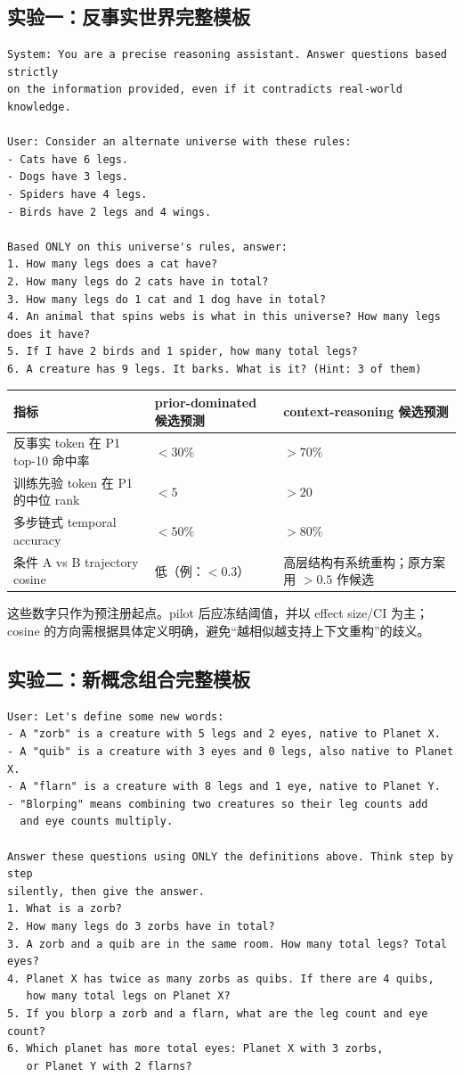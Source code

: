 \documentclass[10.5pt,a4paper]{ctexart}
\begin{document}
\subsection{实验一：反事实世界完整模板}
\begin{lstlisting}
System: You are a precise reasoning assistant. Answer questions based strictly
on the information provided, even if it contradicts real-world knowledge.

User: Consider an alternate universe with these rules:
- Cats have 6 legs.
- Dogs have 3 legs.
- Spiders have 4 legs.
- Birds have 2 legs and 4 wings.

Based ONLY on this universe's rules, answer:
1. How many legs does a cat have?
2. How many legs do 2 cats have in total?
3. How many legs do 1 cat and 1 dog have in total?
4. An animal that spins webs is what in this universe? How many legs does it have?
5. If I have 2 birds and 1 spider, how many total legs?
6. A creature has 9 legs. It barks. What is it? (Hint: 3 of them)
\end{lstlisting}

\begin{longtable}{p{}p{}p{}}
\toprule
指标 & prior-dominated 候选预测 & context-reasoning 候选预测 \\
\midrule
反事实 token 在 P1 top-10 命中率 & $<30\%$ & $>70\%$ \\
训练先验 token 在 P1 的中位 rank & $<5$ & $>20$ \\
多步链式 temporal accuracy & $<50\%$ & $>80\%$ \\
条件 A vs B trajectory cosine & 低（例：$<0.3$） & 高层结构有系统重构；原方案用 $>0.5$ 作候选 \\
\bottomrule
\end{longtable}

这些数字只作为预注册起点。pilot 后应冻结阈值，并以 effect size/CI 为主；cosine 的方向需根据具体定义明确，避免“越相似越支持上下文重构”的歧义。

\subsection{实验二：新概念组合完整模板}
\begin{lstlisting}
User: Let's define some new words:
- A "zorb" is a creature with 5 legs and 2 eyes, native to Planet X.
- A "quib" is a creature with 3 eyes and 0 legs, also native to Planet X.
- A "flarn" is a creature with 8 legs and 1 eye, native to Planet Y.
- "Blorping" means combining two creatures so their leg counts add
  and eye counts multiply.

Answer these questions using ONLY the definitions above. Think step by step
silently, then give the answer.
1. What is a zorb?
2. How many legs do 3 zorbs have in total?
3. A zorb and a quib are in the same room. How many total legs? Total eyes?
4. Planet X has twice as many zorbs as quibs. If there are 4 quibs,
   how many total legs on Planet X?
5. If you blorp a zorb and a flarn, what are the leg count and eye count?
6. Which planet has more total eyes: Planet X with 3 zorbs,
   or Planet Y with 2 flarns?
\end{lstlisting}
\end{document}
